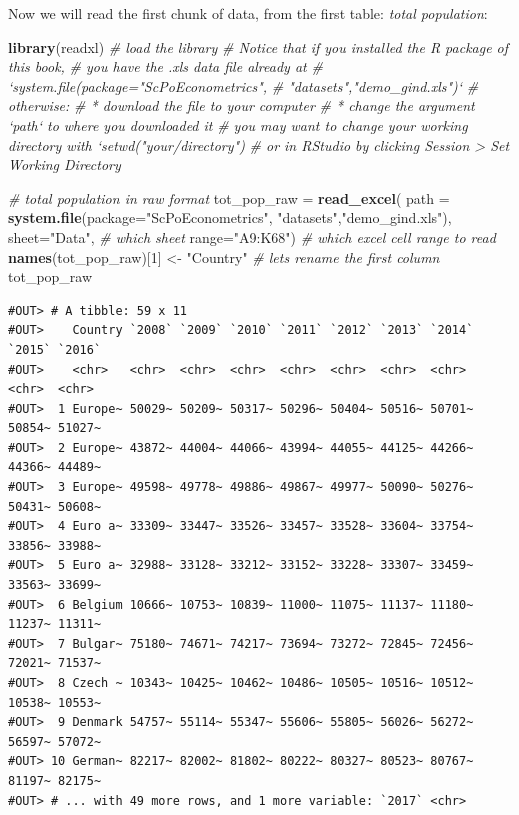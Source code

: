 \documentclass[]{book}
\newenvironment{Shaded}{\begin{snugshade}}{\end{snugshade}}
\newcommand{\CommentTok}[1]{\textcolor[rgb]{0.56,0.35,0.01}{\textit{#1}}}
\newcommand{\DataTypeTok}[1]{\textcolor[rgb]{0.13,0.29,0.53}{#1}}
\newcommand{\DecValTok}[1]{\textcolor[rgb]{0.00,0.00,0.81}{#1}}
\newcommand{\KeywordTok}[1]{\textcolor[rgb]{0.13,0.29,0.53}{\textbf{#1}}}
\newcommand{\NormalTok}[1]{#1}
\newcommand{\StringTok}[1]{\textcolor[rgb]{0.31,0.60,0.02}{#1}}
\begin{document}
Now we will read the first chunk of data, from the first table: \emph{total population}:

\begin{Shaded}
\begin{Highlighting}[]
\KeywordTok{library}\NormalTok{(readxl)  }\CommentTok{# load the library}
\CommentTok{# Notice that if you installed the R package of this book,}
\CommentTok{# you have the .xls data file already at }
\CommentTok{# `system.file(package="ScPoEconometrics",}
\CommentTok{#                        "datasets","demo_gind.xls")`}
\CommentTok{# otherwise:}
\CommentTok{# * download the file to your computer}
\CommentTok{# * change the argument `path` to where you downloaded it}
\CommentTok{# you may want to change your working directory with `setwd("your/directory")}
\CommentTok{# or in RStudio by clicking Session > Set Working Directory}

\CommentTok{# total population in raw format}
\NormalTok{tot_pop_raw =}\StringTok{ }\KeywordTok{read_excel}\NormalTok{(}
                \DataTypeTok{path =} \KeywordTok{system.file}\NormalTok{(}\DataTypeTok{package=}\StringTok{"ScPoEconometrics"}\NormalTok{,}
                                    \StringTok{"datasets"}\NormalTok{,}\StringTok{"demo_gind.xls"}\NormalTok{), }
                \DataTypeTok{sheet=}\StringTok{"Data"}\NormalTok{, }\CommentTok{# which sheet}
                \DataTypeTok{range=}\StringTok{"A9:K68"}\NormalTok{)  }\CommentTok{# which excel cell range to read}
\KeywordTok{names}\NormalTok{(tot_pop_raw)[}\DecValTok{1}\NormalTok{] <-}\StringTok{ "Country"}   \CommentTok{# lets rename the first column}
\NormalTok{tot_pop_raw}
\end{Highlighting}
\end{Shaded}

\begin{verbatim}
#OUT> # A tibble: 59 x 11
#OUT>    Country `2008` `2009` `2010` `2011` `2012` `2013` `2014` `2015` `2016`
#OUT>    <chr>   <chr>  <chr>  <chr>  <chr>  <chr>  <chr>  <chr>  <chr>  <chr> 
#OUT>  1 Europe~ 50029~ 50209~ 50317~ 50296~ 50404~ 50516~ 50701~ 50854~ 51027~
#OUT>  2 Europe~ 43872~ 44004~ 44066~ 43994~ 44055~ 44125~ 44266~ 44366~ 44489~
#OUT>  3 Europe~ 49598~ 49778~ 49886~ 49867~ 49977~ 50090~ 50276~ 50431~ 50608~
#OUT>  4 Euro a~ 33309~ 33447~ 33526~ 33457~ 33528~ 33604~ 33754~ 33856~ 33988~
#OUT>  5 Euro a~ 32988~ 33128~ 33212~ 33152~ 33228~ 33307~ 33459~ 33563~ 33699~
#OUT>  6 Belgium 10666~ 10753~ 10839~ 11000~ 11075~ 11137~ 11180~ 11237~ 11311~
#OUT>  7 Bulgar~ 75180~ 74671~ 74217~ 73694~ 73272~ 72845~ 72456~ 72021~ 71537~
#OUT>  8 Czech ~ 10343~ 10425~ 10462~ 10486~ 10505~ 10516~ 10512~ 10538~ 10553~
#OUT>  9 Denmark 54757~ 55114~ 55347~ 55606~ 55805~ 56026~ 56272~ 56597~ 57072~
#OUT> 10 German~ 82217~ 82002~ 81802~ 80222~ 80327~ 80523~ 80767~ 81197~ 82175~
#OUT> # ... with 49 more rows, and 1 more variable: `2017` <chr>
\end{verbatim}
\end{document}
